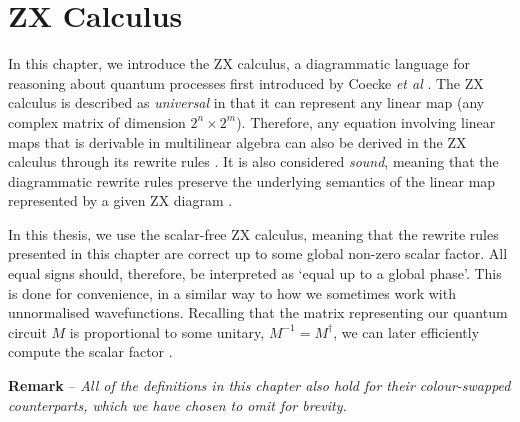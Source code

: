 \chapter{ZX Calculus}%
\label{zx-calculus}

In this chapter, we introduce the ZX calculus, a diagrammatic language for reasoning about quantum processes first introduced by Coecke \textit{et al} \cite{Coecke2011}. The ZX calculus is described as \textit{universal} in that it can represent any linear map (any complex matrix of dimension $2^n \times 2^m$). Therefore, any equation involving linear maps that is derivable in multilinear algebra can also be derived in the ZX calculus through its rewrite rules \cite{Poor2023}. It is also considered \textit{sound}, meaning that the diagrammatic rewrite rules preserve the underlying semantics of the linear map represented by a given ZX diagram \cite{Wetering2020}.

In this thesis, we use the scalar-free ZX calculus, meaning that the rewrite rules presented in this chapter are correct up to some global non-zero scalar factor. All equal signs should, therefore, be interpreted as `equal up to a global phase'. This is done for convenience, in a similar way to how we sometimes work with unnormalised wavefunctions. Recalling that the matrix representing our quantum circuit $M$ is proportional to some unitary, $M^{-1} = M^\dagger$, we can later efficiently compute the scalar factor \cite{Wetering2020}.

\hangindent=10pt 
\textbf{Remark} -- \textit{All of the definitions in this chapter also hold for their colour-swapped counterparts, which we have chosen to omit for brevity.}


